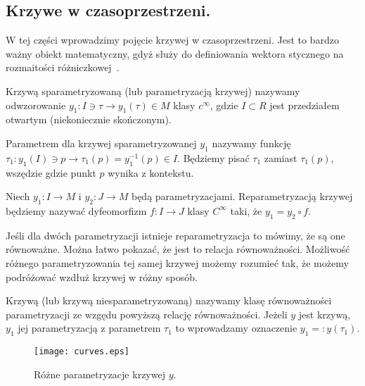 \subsection{Krzywe w czasoprzestrzeni.}
W tej części wprowadzimy pojęcie krzywej w czasoprzestrzeni. 
Jest to bardzo ważny obiekt matematyczny, gdyż służy do definiowania
wektora stycznego na rozmaitości różniczkowej~\cite{ganca1987}.
\begin{definition}
Krzywą sparametryzowaną (lub parametryzacją krzywej) nazywamy 
odwzorowanie 
$ y_1 : I \ni \tau \to y_1(\tau) \in M$ klasy $c^\infty$, 
gdzie $I \subset R$ 
jest przedziałem otwartym (niekoniecznie skończonym).
\end{definition}
\begin{definition}
Parametrem dla krzywej sparametryzowanej $y_1$ 
nazywamy funkcję $ \tau_1: y_1(I) \ni p 
\to \tau_1(p) = y_1^{-1}( p )\in I$. 
Będziemy pisać
$\tau_1$ zamiast $\tau_1(p)$, wszędzie gdzie punkt $p$ 
wynika z kontekstu.
\end{definition}
\begin{definition}
Niech $y_1: I \to M$ i $y_2:J\to M$ będą parametryzacjami.
Reparametryzacją krzywej będziemy nazywać dyfeomorfizm $f : I \to J$
klasy $C^\infty$
taki, że $y_1 = y_2 \circ f$.
\end{definition}
Jeśli dla dwóch parametryzacji istnieje reparametryzacja to 
mówimy, że są one równoważne. Można łatwo pokazać, że jest to
relacja równoważności. Możliwość różnego parametryzowania tej 
samej krzywej możemy rozumieć tak, że możemy podróżować wzdłuż
krzywej w różny sposób.
\begin{definition}
Krzywą (lub krzywą niesparametryzowaną) nazywamy klasę równoważności
parametryzacji ze wzgędu powyższą relację równoważności.
Jeżeli $y$ jest krzywą, $y_1$ jej parametryzacją z parametrem $\tau_1$
to wprowadzamy oznaczenie $y_1 =: y(\tau_1)$.
\end{definition}
\begin{figure}
\centering
\texttt{[image: curves.eps]}
\caption{Różne parametryzacje krzywej $y$.}
\end{figure}
